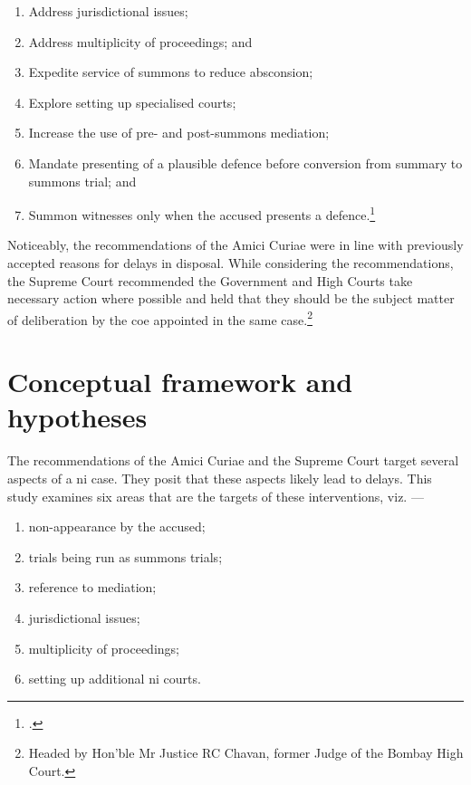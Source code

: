 \begin{enumerate}[label=(\alph*)]
 \item Address jurisdictional issues;
 \item Address multiplicity of proceedings; and
 \item Expedite service of summons to reduce absconsion;
 \item Explore setting up specialised courts;
 \item Increase the use of pre- and post-summons mediation;
 \item Mandate presenting of a plausible defence before conversion from summary to summons trial; and
 \item Summon witnesses only when the accused presents a defence.\footcite{amicus2020_submission}
\end{enumerate}

Noticeably, the recommendations of the Amici Curiae were in line with previously accepted reasons for delays in disposal. While considering the recommendations, the Supreme Court recommended the Government and High Courts take necessary action where possible and held that they should be the subject matter of deliberation by the \gls{coe} appointed in the same case.\footnote{Headed by Hon’ble Mr Justice RC Chavan, former Judge of the Bombay High Court.}

\section{Conceptual framework and hypotheses}
\label{sec:select-case-char}

The recommendations of the Amici Curiae and the Supreme Court target several aspects of a \gls{ni} case. They posit that these aspects likely lead to delays. This study examines six areas that are the targets of these interventions, viz. ---

\begin{enumerate}
\item non-appearance by the accused;
\item trials being run as summons trials;
\item reference to mediation;
\item jurisdictional issues;
\item multiplicity of proceedings;
\item setting up additional \gls{ni} courts.
\end{enumerate}

